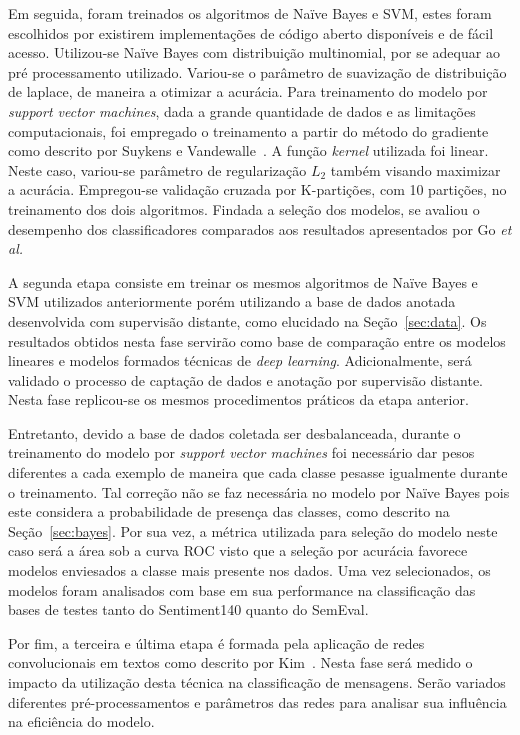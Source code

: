 Em seguida, foram treinados os algoritmos de Naïve Bayes e SVM, estes foram escolhidos por existirem implementações de
código aberto disponíveis e de fácil acesso.
Utilizou-se Naïve Bayes com distribuição multinomial, por se adequar ao pré processamento utilizado.
Variou-se o parâmetro de suavização de distribuição de laplace, de maneira a otimizar a acurácia.
Para treinamento do modelo por \textit{support vector machines}, dada a grande quantidade de dados e as limitações
computacionais, foi empregado o treinamento a partir do método do gradiente como descrito por Suykens e
Vandewalle~\cite{suykens99}.
A função \textit{kernel} utilizada foi linear.
Neste caso, variou-se parâmetro de regularização $L_{2}$ também visando maximizar a acurácia.
Empregou-se validação cruzada por K-partições, com 10 partições, no treinamento dos dois algoritmos.
Findada a seleção dos modelos, se avaliou o desempenho dos classificadores comparados aos resultados apresentados por Go
\textit{et al.}

A segunda etapa consiste em treinar os mesmos algoritmos de Naïve Bayes e SVM utilizados anteriormente porém utilizando
a base de dados anotada desenvolvida com supervisão distante, como elucidado na Seção~\ref{sec:data}.
Os resultados obtidos nesta fase servirão como base de comparação entre os modelos lineares e modelos formados técnicas
de \textit{deep learning}.
Adicionalmente, será validado o processo de captação de dados e anotação por supervisão distante.
Nesta fase replicou-se os mesmos procedimentos práticos da etapa anterior.

Entretanto, devido a base de dados coletada ser desbalanceada, durante o treinamento do modelo por
\textit{support vector machines} foi necessário dar pesos diferentes a cada exemplo de maneira que cada classe pesasse
igualmente durante o treinamento.
Tal correção não se faz necessária no modelo por Naïve Bayes pois este considera a probabilidade de presença das classes,
como descrito na Seção~\ref{sec:bayes}.
Por sua vez, a métrica utilizada para seleção do modelo neste caso será a área sob a curva ROC visto que a seleção por
acurácia favorece modelos enviesados a classe mais presente nos dados.
Uma vez selecionados, os modelos foram analisados com base em sua performance na classificação das bases de testes tanto
do Sentiment140 quanto do SemEval.

Por fim, a terceira e última etapa é formada pela aplicação de redes convolucionais em textos como descrito por
Kim~\cite{kim14}.
Nesta fase será medido o impacto da utilização desta técnica na classificação de mensagens.
Serão variados diferentes pré-processamentos e parâmetros das redes para analisar sua influência na eficiência do
modelo.

